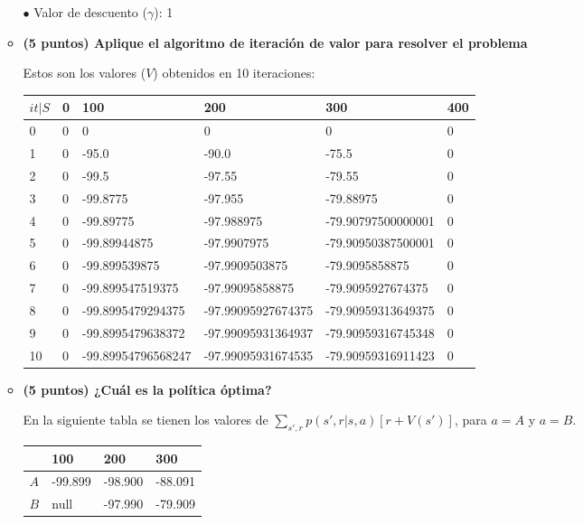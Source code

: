 \documentclass[a4paper,10pt]{article}
\begin{document}
\begin{enumerate}
\begin{itemize}
	$\bullet$ Valor de descuento ($\gamma$): 1

	\item \textbf{(5 puntos) Aplique el algoritmo de iteración de valor para resolver el problema}
	
	Estos son los valores ($V$) obtenidos en 10 iteraciones:
	
	\begin{tabular}{|l|l|l|l|l|l|}
	\hline
	$it | S$ & 0 & 100 & 200 & 300 & 400 \\ \hline
	0 & 0 & 0 & 0 & 0 & 0 \\ \hline
        1 & 0 & -95.0 & -90.0 & -75.5 & 0 \\ \hline
        2 & 0 & -99.5 & -97.55 & -79.55 & 0 \\ \hline
        3 & 0 & -99.8775 & -97.955 & -79.88975 & 0 \\ \hline
        4 & 0 & -99.89775 & -97.988975 & -79.90797500000001 & 0 \\ \hline
        5 & 0 & -99.89944875 & -97.9907975 & -79.90950387500001 & 0 \\ \hline
        6 & 0 & -99.899539875 & -97.9909503875 & -79.9095858875 & 0 \\ \hline
        7 & 0 & -99.899547519375 & -97.99095858875 & -79.9095927674375 & 0 \\ \hline
        8 & 0 & -99.8995479294375 & -97.99095927674375 & -79.90959313649375 & 0 \\ \hline
        9 & 0 & -99.8995479638372 & -97.99095931364937 & -79.90959316745348 & 0 \\ \hline
        10 & 0 &-99.89954796568247 & -97.99095931674535 & -79.90959316911423 & 0 \\ \hline

	\end{tabular}
	
	\item \textbf{(5 puntos) ¿Cuál es la política óptima?}
	
	En la siguiente tabla se tienen los valores de $\sum_{s', r}p(s',r | s,a)[r + V(s')]$, para $a=A$ y $a=B$.
	
	\begin{tabular}{|l|l|l|l|}
	\hline
	    & 100 & 200 & 300 \\ \hline
	$A$ & -99.899 & -98.900 & -88.091 \\ \hline
        $B$ & null & -97.990 & -79.909 \\ \hline
	\end{tabular}
	

\end{itemize}
\end{enumerate}
\end{document}
